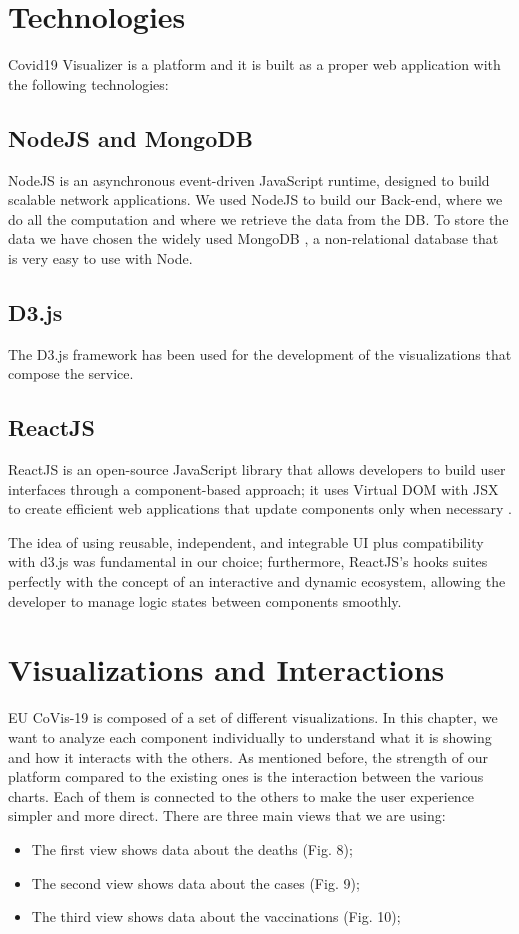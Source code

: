 \documentclass[10pt,conference]{IEEEtran}
\begin{document}
\section{Technologies}
Covid19 Visualizer is a platform and it is built as a proper web application with the following technologies:

\subsection{NodeJS and MongoDB}
NodeJS is an asynchronous event-driven JavaScript runtime, designed to build scalable network applications.
We used NodeJS \cite{node} to build our Back-end, where we do all the computation and where we retrieve the data from the DB. To store the data we have chosen the widely used
MongoDB \cite{mongo}, a non-relational database that is very easy to use with Node.

\subsection{D3.js}
The D3.js framework \cite{d3} has been used for the development of the visualizations that compose the service.

\subsection{ReactJS}
ReactJS is an open-source JavaScript library that allows developers to build user interfaces through a component-based approach; it uses Virtual DOM with JSX to create efficient web applications that update components only when necessary \cite{react}.

The idea of using reusable, independent, and integrable UI plus compatibility with d3.js was fundamental in our choice;
furthermore, ReactJS's hooks suites perfectly with the concept of an interactive and dynamic ecosystem, allowing the developer to manage logic states between components smoothly.


\section{Visualizations and Interactions}
EU CoVis-19 is composed of a set of different visualizations. In this chapter, we want to analyze each component individually to understand what it
is showing and how it interacts with the others. As mentioned before, the strength of our platform compared to the existing ones is 
the interaction between the various charts. Each of them is connected to the others to make the user experience 
simpler and more direct.
There are three main views that we are using:
\begin{itemize}
 \item The first view shows data about the deaths (Fig. 8);
 \item The second view shows data about the cases (Fig. 9);
 \item The third view shows data about the vaccinations (Fig. 10);
\end{itemize}
\end{document}
